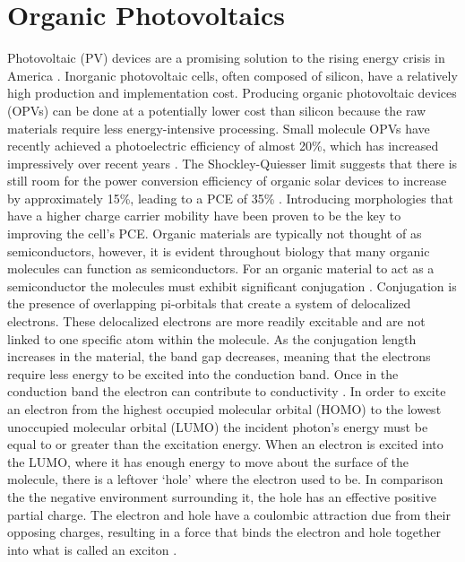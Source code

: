 \section{Organic Photovoltaics}
Photovoltaic (PV) devices are a promising solution to the rising energy crisis in America \citep{mazzio_future_2015}. Inorganic photovoltaic cells, often composed of silicon, have a relatively high production and implementation cost\citep{mazzio_future_2015}. Producing organic photovoltaic devices (OPVs) can be done at a potentially lower cost than silicon because the raw materials require less energy-intensive processing. Small molecule OPVs have recently achieved a photoelectric efficiency of almost 20\%, which has increased impressively over recent years \citep{sun_span_2022}. The Shockley-Quiesser limit suggests that there is still room for the power conversion efficiency of organic solar devices to increase by approximately 15\%, leading to a PCE of 35\% \citep{miller_strong_2012}. Introducing morphologies that have a higher charge carrier mobility have been proven to be the key to improving the cell’s PCE. 
Organic materials are typically not thought of as semiconductors, however, it is evident throughout biology that many organic molecules can function as semiconductors. For an organic material to act as a semiconductor the molecules must exhibit significant conjugation \citep{kularatne_donoracceptor_2013}. Conjugation is the presence of overlapping pi-orbitals that create a system of delocalized electrons. These delocalized electrons are more readily excitable and are not linked to one specific atom within the molecule. As the conjugation length increases in the material, the band gap decreases, meaning that the electrons require less energy to be excited into the conduction band. Once in the conduction band the electron can contribute to conductivity \citep{callister_materials_2010}. In order to excite an electron from the highest occupied molecular orbital (HOMO) to the lowest unoccupied molecular orbital (LUMO) the incident photon’s energy must be equal to or greater than the excitation energy. When an electron is excited into the LUMO, where it has enough energy to move about the surface of the molecule, there is a leftover ‘hole’ where the electron used to be. In comparison the the negative environment surrounding it, the hole has an effective positive partial charge. The electron and hole have a coulombic attraction due from their opposing charges, resulting in a force that binds the electron and hole together into what is called an exciton \citep{reis_effect_2022}.
